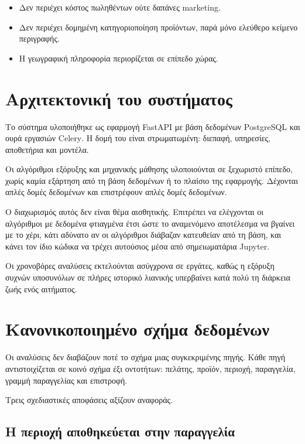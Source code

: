 \begin{itemize}
  \item Δεν περιέχει κόστος πωληθέντων ούτε δαπάνες marketing.
  \item Δεν περιέχει δομημένη κατηγοριοποίηση προϊόντων, παρά μόνο ελεύθερο
        κείμενο περιγραφής.
  \item Η γεωγραφική πληροφορία περιορίζεται σε επίπεδο χώρας.
\end{itemize}

\section{Αρχιτεκτονική του συστήματος}

Το σύστημα υλοποιήθηκε ως εφαρμογή \textenglish{FastAPI} με βάση δεδομένων
\textenglish{PostgreSQL} και ουρά εργασιών \textenglish{Celery}. Η δομή του
είναι στρωματωμένη: διεπαφή, υπηρεσίες, αποθετήρια και μοντέλα.

Οι αλγόριθμοι εξόρυξης και μηχανικής μάθησης υλοποιούνται σε ξεχωριστό επίπεδο,
χωρίς καμία εξάρτηση από τη βάση δεδομένων ή το πλαίσιο της εφαρμογής. Δέχονται
απλές δομές δεδομένων και επιστρέφουν απλές δομές δεδομένων.

Ο διαχωρισμός αυτός δεν είναι θέμα αισθητικής. Επιτρέπει να ελέγχονται οι
αλγόριθμοι με δεδομένα φτιαγμένα έτσι ώστε το αναμενόμενο αποτέλεσμα να
βγαίνει με το χέρι, κάτι αδύνατο αν οι αλγόριθμοι διάβαζαν κατευθείαν από τη
βάση, και κάνει τον ίδιο κώδικα να τρέχει αυτούσιος μέσα από σημειωματάρια
\textenglish{Jupyter}.

Οι χρονοβόρες αναλύσεις εκτελούνται ασύγχρονα σε εργάτες, καθώς η εξόρυξη
συχνών υποσυνόλων σε πλήρες ιστορικό λιανικής υπερβαίνει κατά πολύ τη διάρκεια
ζωής ενός αιτήματος.

\section{Κανονικοποιημένο σχήμα δεδομένων}

Οι αναλύσεις δεν διαβάζουν ποτέ το σχήμα μιας συγκεκριμένης πηγής. Κάθε πηγή
αντιστοιχίζεται σε κοινό σχήμα έξι οντοτήτων: πελάτης, προϊόν, περιοχή,
παραγγελία, γραμμή παραγγελίας και επιστροφή.

Τρεις σχεδιαστικές αποφάσεις αξίζουν αναφοράς.

\subsection{Η περιοχή αποθηκεύεται στην παραγγελία}

